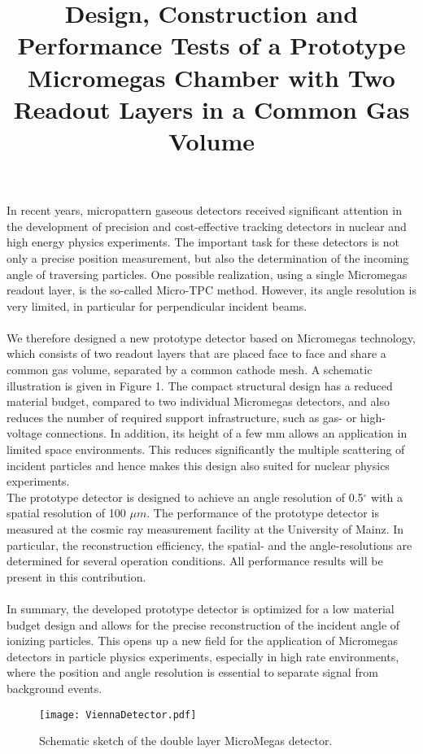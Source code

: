 \documentclass[a4paper]{article}
\begin{document}
\title{Design, Construction and Performance Tests of a Prototype Micromegas Chamber with Two Readout Layers in a Common Gas Volume}

\maketitle

In recent years, micropattern gaseous detectors received significant attention in the development of precision and cost-effective tracking detectors in nuclear and high energy physics experiments. The important task for these detectors is not only a precise position measurement, but also the determination of the incoming angle of traversing particles. One possible realization, using a single Micromegas readout layer, is the so-called Micro-TPC method. However, its angle resolution is very limited, in particular for perpendicular incident beams.
\\
\\
We therefore designed a new prototype detector based on Micromegas technology, which consists of two readout layers that are placed face to face and share a common gas volume, separated by a common cathode mesh. A schematic illustration is given in Figure 1. The compact structural design has a reduced material budget, compared to two individual Micromegas detectors, and also reduces the number of required support infrastructure, such as gas- or high-voltage connections. In addition, its height of a few mm allows an application in limited space environments. This reduces significantly the multiple scattering of incident particles and hence makes this design also suited for nuclear physics experiments.
\\
The prototype detector is designed to achieve an angle resolution of 0.5$^\circ$ with a spatial resolution of 100 $\mu m$. The performance of the prototype detector is measured at the cosmic ray measurement facility at the University of Mainz. In particular, the reconstruction efficiency, the spatial- and the angle-resolutions are determined for several operation conditions. All performance results will be present in this contribution.
\\
\\
In summary, the developed prototype detector is optimized for a low material budget design and allows for the precise reconstruction of the incident angle of ionizing particles. This opens up a new field for the application of Micromegas detectors in particle physics experiments, especially in high rate environments, where the position and angle resolution is essential to separate signal from background events.

\begin{figure}
    \centering
    \texttt{[image: ViennaDetector.pdf]}
    \caption{Schematic sketch of the double layer MicroMegas detector.}
    \label{simulationfigure}
\end{figure}
\end{document}
